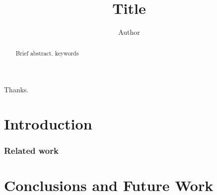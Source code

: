 \documentclass{kaureport}
\title{Title}
\author{Author}
\institute{Department of Mathematics and Computer Science}
\begin{document}
\frontmatter
\begin{abstract}
  Brief abstract.
  \keywords keywords
\end{abstract}
\begin{acknowledgements}
  Thanks.
\end{acknowledgements}
\tableofcontents
\mainmatter
\part{Introduction}
\section{Related work}
\part{Conclusions and Future Work}
\end{document}
